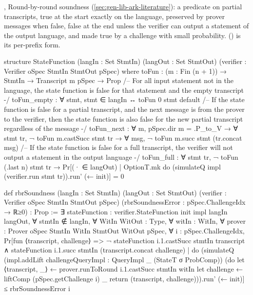 \begin{define}{, }
Round-by-round soundness (\cref{sec:gen-lib-ark-literature}): a predicate on partial transcripts,
true at the start exactly on the language, preserved by prover messages when false, false at the
end unless the verifier can output a statement of the output language, and made true by a
challenge with small probability. 
(\allowbreak{}) is its per-prefix form.
\end{define}

\begin{leancode}
structure StateFunction
    (langIn : Set StmtIn) (langOut : Set StmtOut)
    (verifier : Verifier oSpec StmtIn StmtOut pSpec)
    where
  toFun : (m : Fin (n + 1)) → StmtIn → Transcript m pSpec → Prop
  /-- For all input statement not in the language, the state function is false for that statement
    and the empty transcript -/
  toFun_empty : ∀ stmt, stmt ∈ langIn ↔ toFun 0 stmt default
  /-- If the state function is false for a partial transcript, and the next message is from the
    prover to the verifier, then the state function is also false for the new partial transcript
    regardless of the message -/
  toFun_next : ∀ m, pSpec.dir m = .P_to_V →
    ∀ stmt tr, ¬ toFun m.castSucc stmt tr →
    ∀ msg, ¬ toFun m.succ stmt (tr.concat msg)
  /-- If the state function is false for a full transcript, the verifier will not output a statement
    in the output language -/
  toFun_full : ∀ stmt tr, ¬ toFun (.last n) stmt tr →
    Pr[(· ∈ langOut) | OptionT.mk do (simulateQ impl (verifier.run stmt tr)).run' (← init)] = 0
\end{leancode}



\begin{leancode}
def rbrSoundness (langIn : Set StmtIn) (langOut : Set StmtOut)
    (verifier : Verifier oSpec StmtIn StmtOut pSpec)
    (rbrSoundnessError : pSpec.ChallengeIdx → ℝ≥0) : Prop :=
  ∃ stateFunction : verifier.StateFunction init impl langIn langOut,
  ∀ stmtIn ∉ langIn,
  ∀ WitIn WitOut : Type,
  ∀ witIn : WitIn,
  ∀ prover : Prover oSpec StmtIn WitIn StmtOut WitOut pSpec,
  ∀ i : pSpec.ChallengeIdx,
    Pr[fun ⟨transcript, challenge⟩ =>
      ¬ stateFunction i.1.castSucc stmtIn transcript ∧
        stateFunction i.1.succ stmtIn (transcript.concat challenge)
    | do
      (simulateQ (impl.addLift challengeQueryImpl : QueryImpl _ (StateT σ ProbComp))
        (do
          let ⟨transcript, _⟩ ← prover.runToRound i.1.castSucc stmtIn witIn
          let challenge ← liftComp (pSpec.getChallenge i) _
          return (transcript, challenge))).run' (← init)] ≤
      rbrSoundnessError i
\end{leancode}

